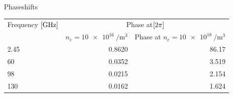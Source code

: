 \documentclass[hyperref={colorlinks=true,urlcolor=blue,linkcolor=.},aspectratio=1610,mathserif]{beamer}
\begin{document}
\begin{frame}{Phaseshifts}
	\centering
	\begin{table}
		\begin{tabular}{lrr}

			Frequency \(\bqty{\si{\giga\hertz}}\) & \multicolumn{2}{c}{Phase at\(\bqty{2\pi}\)}                                                 \\
			                                      & \(n_e=\SI{10e16}{\per\meter\cubed}\)        & Phase at \(n_e=\SI{10e18}{\per\meter\cubed}\) \\
			2.45                                  & 0.8620                                      & 86.17                                         \\
			60                                    & 0.0352                                      & 3.519                                         \\
			98                                    & 0.0215                                      & 2.154                                         \\
			130                                   & 0.0162                                      & 1.624                                         \\
		\end{tabular}
	\end{table}
\end{frame}
\end{document}
